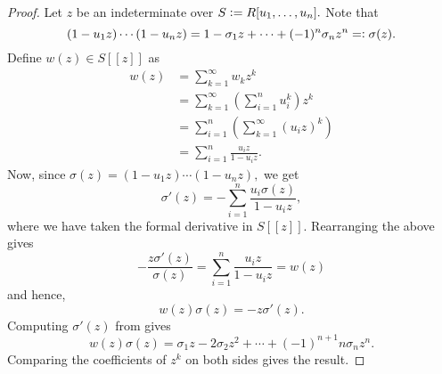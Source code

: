 \powersumformulae*\label{thm:powersumformulae2}
\begin{flushright}\hyperref[thm:powersumformulae]{\upsym}\end{flushright}
\begin{proof}
    Let $z$ be an indeterminate over $S \vcentcolon= R[u_1, \ldots, u_n].$ Note that 
    \begin{equation} \label{eq:001}
        (1 - u_1z) \cdots (1 - u_nz) = 1 - \sigma_1z + \cdots + (-1)^n \sigma_n z^n =\vcentcolon \sigma(z).
    \end{equation}
    Define $w(z) \in S[\![z]\!]$ as
    \begin{align*} 
        w(z) &= \sum_{k = 1}^{\infty} w_kz^k\\
        &= \sum_{k = 1}^{\infty}\left(\sum_{i = 1}^{n}u_i^k\right)z^k\\
        &= \sum_{i = 1}^{n} \left(\sum_{k = 1}^{\infty}(u_iz)^k\right)\\
        &= \sum_{i = 1}^{n} \frac{u_iz}{1 - u_iz}.
    \end{align*}
    Now, since $\sigma(z) = (1 - u_1z) \cdots (1 - u_nz),$ we get
    \begin{equation*} 
        \sigma'(z) = - \sum_{i = 1}^{n} \frac{u_i \sigma(z)}{1 - u_i z},
    \end{equation*}
    where we have taken the formal derivative in $S[\![z]\!].$ Rearranging the above gives
    \begin{equation*} 
        -\frac{z\sigma'(z)}{\sigma(z)} = \sum_{i = 1}^{n}\frac{u_i z}{1 - u_i z} = w(z)
    \end{equation*}
    and hence,
    \begin{equation*} 
        w(z)\sigma(z) = -z\sigma'(z).
    \end{equation*}
    Computing $\sigma'(z)$ from  gives
    \begin{equation*} 
        w(z)\sigma(z) = \sigma_1z - 2\sigma_2z^2 + \cdots + (-1)^{n + 1}n\sigma_nz^n.
    \end{equation*}
    Comparing the coefficients of $z^k$ on both sides gives the result.
\end{proof}

